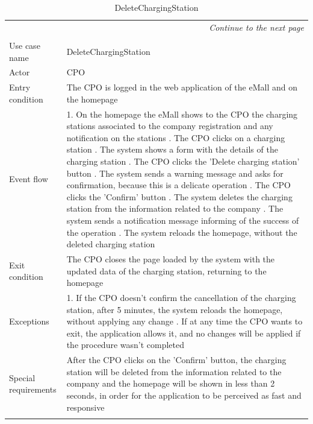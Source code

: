 \begin{center}
    \begin{longtable}{p{4cm} p{11cm}}
    \multicolumn{2}{r}{\itshape{Continue to the next page}}\\
    \endfoot 
    \\
    \endlastfoot
    \hline
     Use case name &  DeleteChargingStation\\
     \hline
     Actor & CPO \\
     \hline
     Entry condition & The CPO is logged in the web application of the eMall and on the homepage \\
     \hline
     Event flow &   1. On the homepage the eMall shows to the CPO the charging stations associated to the company                   registration and any notification on the stations \newline
                    2. The CPO clicks on a charging station \newline 
                    3. The system shows a form with the details of the charging station \newline
                    4. The CPO clicks the 'Delete charging station' button \newline
                    5. The system sends a warning message and asks for confirmation, because this is a delicate operation \newline
                    6. The CPO clicks the 'Confirm' button \newline
                    7. The system deletes the charging station from the information related to the company \newline
                    8. The system sends a notification message informing of the success of the operation \newline
                    9. The system reloads the homepage, without the deleted charging station\\
     \hline
     Exit condition &  The CPO closes the page loaded by the system with the updated data of the charging station, returning to the homepage \\
     \hline
     Exceptions &   1. If the CPO doesn't confirm the cancellation of the charging station, after 5 minutes, the                    system reloads the homepage, without applying any change \newline
                    2. If at any time the CPO wants to exit, the application allows it, and no changes will be applied if the procedure wasn't completed \\
     \hline
     Special requirements & After the CPO clicks on the 'Confirm' button, the charging station will be deleted from the information related to the company and the homepage will be shown in less than 2 seconds, in order for the application to be perceived as fast and responsive \\
     \hline
    \caption{DeleteChargingStation}
    \label{tab:DeleteChargingStation}
    \end{longtable}
\end{center}


